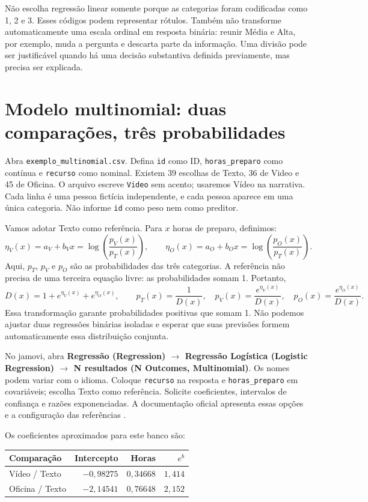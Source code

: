 Não escolha regressão linear somente porque as categorias foram codificadas como 1, 2 e 3. Esses códigos podem representar rótulos. Também não transforme automaticamente uma escala ordinal em resposta binária: reunir Média e Alta, por exemplo, muda a pergunta e descarta parte da informação. Uma divisão pode ser justificável quando há uma decisão substantiva definida previamente, mas precisa ser explicada.

\section{Modelo multinomial: duas comparações, três probabilidades}

Abra \texttt{exemplo\_multinomial.csv}. Defina \texttt{id} como ID, \texttt{horas\_preparo} como contínua e \texttt{recurso} como nominal. Existem 39 escolhas de Texto, 36 de Video e 45 de Oficina. O arquivo escreve \texttt{Video} sem acento; usaremos Vídeo na narrativa. Cada linha é uma pessoa fictícia independente, e cada pessoa aparece em uma única categoria. Não informe \texttt{id} como peso nem como preditor.

Vamos adotar Texto como referência. Para $x$ horas de preparo, definimos:
\[
\eta_V(x)=a_V+b_Vx=\log\left(\frac{p_V(x)}{p_T(x)}\right),
\qquad
\eta_O(x)=a_O+b_Ox=\log\left(\frac{p_O(x)}{p_T(x)}\right).
\]
Aqui, $p_T$, $p_V$ e $p_O$ são as probabilidades das três categorias. A referência não precisa de uma terceira equação livre: as probabilidades somam 1. Portanto,
\[
D(x)=1+e^{\eta_V(x)}+e^{\eta_O(x)},\qquad
p_T(x)=\frac{1}{D(x)},\quad
p_V(x)=\frac{e^{\eta_V(x)}}{D(x)},\quad
p_O(x)=\frac{e^{\eta_O(x)}}{D(x)}.
\]
Essa transformação garante probabilidades positivas que somam 1. Não podemos ajustar duas regressões binárias isoladas e esperar que suas previsões formem automaticamente essa distribuição conjunta.

No jamovi, abra \textbf{Regressão (Regression) $\rightarrow$ Regressão Logística (Logistic Regression) $\rightarrow$ N resultados (N Outcomes, Multinomial)}. Os nomes podem variar com o idioma. Coloque \texttt{recurso} na resposta e \texttt{horas\_preparo} em covariáveis; escolha Texto como referência. Solicite coeficientes, intervalos de confiança e razões exponenciadas. A documentação oficial apresenta essas opções e a configuração das referências \parencite{JamoviMultinomial}.

Os coeficientes aproximados para este banco são:
\begin{center}
\begin{tabular}{lrrr}
\hline
Comparação & Intercepto & Horas & $e^{b}$ \\
\hline
Vídeo / Texto & $-0{,}98275$ & $0{,}34668$ & $1{,}414$ \\
Oficina / Texto & $-2{,}14541$ & $0{,}76648$ & $2{,}152$ \\
\hline
\end{tabular}
\end{center}

